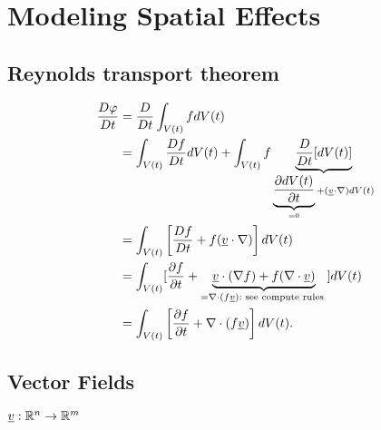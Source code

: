 \section{Modeling Spatial Effects}

\subsection*{Reynolds transport theorem}

\[
\begin{aligned}
 \frac{D \varphi}{D t} & =\frac{D}{D t} \int_{V(t)} f d V(t) \\
& =\int_{V(t)} \frac{D f}{D t} d V(t)+\int_{V(t)} f \underbrace{\frac{D}{D t}[d V(t)]}_{
	\underbrace{\frac{\partial d V(t)}{\partial t}}_{= 0}
	+(\underline{v} \cdot \nabla) d V(t) 
 }\\
& =\int_{V(t)}\left[\frac{D f}{D t}+f(\underline{v} \cdot \nabla)\right] d V(t) \\
& =\int_{V(t)}[\frac{\partial f}{\partial t}+\underbrace{\underline{v} \cdot(\nabla f)+f(\nabla \cdot \underline{v})}_{
	=\nabla \cdot(f \underline{v}): \text { see compute rules }}] d V(t) \\
& =\int_{V(t)}\left[\frac{\partial f}{\partial t}+\nabla \cdot(f \underline{v})\right] d V(t) \text {. } \\
\end{aligned}
\]

\subsection*{Vector Fields}
$\underline{v} : \mathbb{R}^n \to \mathbb{R}^m$



